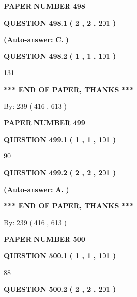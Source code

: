 \documentclass[12pt]{article}
\begin{document}
   
\newpage 
\setcounter{page}{ 
   498001 } 
   
   
 {\textbf{ \Large{ PAPER NUMBER  498  }}}
   
   
   
   
  
  
{\textbf{\large{QUESTION
498.1 
 ( 2 , 2 , 201 )
}}}
 
 
{\textbf{(Auto-answer:}}
{\textbf{\large{
C.}}}
{\textbf{)}}
 
 
  
  
{\textbf{\large{QUESTION
498.2 
 ( 1 , 1 , 101 )
}}}

131
   
   
   
   
\vspace{1.0in} 
{\textbf{\large{ *** END OF PAPER, THANKS *** }}} 
   
   
\hspace{1.0in} By: 
 239 ( 416 ,  613 )
   
   
   
   
\newpage 
\setcounter{page}{ 
   499001 } 
   
   
 {\textbf{ \Large{ PAPER NUMBER  499  }}}
   
   
   
   
  
  
{\textbf{\large{QUESTION
499.1 
 ( 1 , 1 , 101 )
}}}

90
  
  
{\textbf{\large{QUESTION
499.2 
 ( 2 , 2 , 201 )
}}}
 
 
{\textbf{(Auto-answer:}}
{\textbf{\large{
A.}}}
{\textbf{)}}
 
 
   
   
   
   
\vspace{1.0in} 
{\textbf{\large{ *** END OF PAPER, THANKS *** }}} 
   
   
\hspace{1.0in} By: 
 239 ( 416 ,  613 )
   
   
   
   
\newpage 
\setcounter{page}{ 
   500001 } 
   
   
 {\textbf{ \Large{ PAPER NUMBER  500  }}}
   
   
   
   
  
  
{\textbf{\large{QUESTION
500.1 
 ( 1 , 1 , 101 )
}}}

88
  
  
{\textbf{\large{QUESTION
500.2 
 ( 2 , 2 , 201 )
}}}
 
\end{document}
